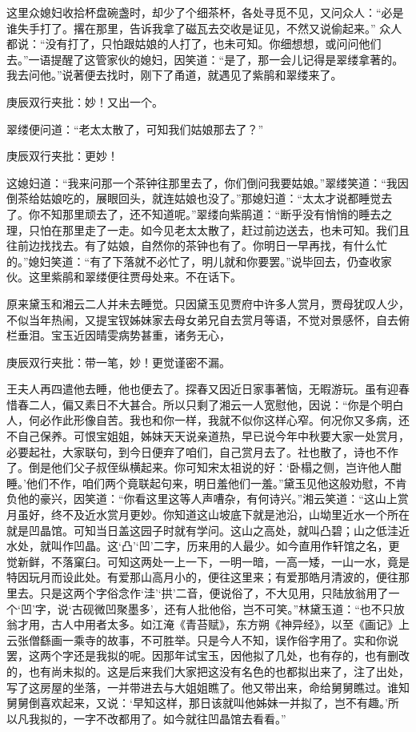 \begin{parag}
    这里众媳妇收拾杯盘碗盏时，却少了个细茶杯，各处寻觅不见，又问众人：“必是谁失手打了。撂在那里，告诉我拿了磁瓦去交收是证见，不然又说偷起来。” 众人都说：“没有打了，只怕跟姑娘的人打了，也未可知。你细想想，或问问他们去。”一语提醒了这管家伙的媳妇，因笑道：“是了，那一会儿记得是翠缕拿著的。我去问他。”说著便去找时，刚下了甬道，就遇见了紫鹃和翠缕来了。\begin{note}庚辰双行夹批：妙！又出一个。\end{note}翠缕便问道：“老太太散了，可知我们姑娘那去了？”\begin{note}庚辰双行夹批：更妙！\end{note}这媳妇道：“我来问那一个茶钟往那里去了，你们倒问我要姑娘。”翠缕笑道：“我因倒茶给姑娘吃的，展眼回头，就连姑娘也没了。”那媳妇道：“太太才说都睡觉去了。你不知那里顽去了，还不知道呢。”翠缕向紫鹃道：“断乎没有悄悄的睡去之理，只怕在那里走了一走。如今见老太太散了，赶过前边送去，也未可知。我们且往前边找找去。有了姑娘，自然你的茶钟也有了。你明日一早再找，有什么忙的。”媳妇笑道：“有了下落就不必忙了，明儿就和你要罢。”说毕回去，仍查收家伙。这里紫鹃和翠缕便往贾母处来。不在话下。
\end{parag}


\begin{parag}
    原来黛玉和湘云二人并未去睡觉。只因黛玉见贾府中许多人赏月，贾母犹叹人少，不似当年热闹，又提宝钗姊妹家去母女弟兄自去赏月等语，不觉对景感怀，自去俯栏垂泪。宝玉近因晴雯病势甚重，诸务无心，\begin{note}庚辰双行夹批：带一笔，妙！更觉谨密不漏。\end{note}王夫人再四遣他去睡，他也便去了。探春又因近日家事著恼，无暇游玩。虽有迎春惜春二人，偏又素日不大甚合。所以只剩了湘云一人宽慰他，因说：“你是个明白人，何必作此形像自苦。我也和你一样，我就不似你这样心窄。何况你又多病，还不自己保养。可恨宝姐姐，姊妹天天说亲道热，早已说今年中秋要大家一处赏月，必要起社，大家联句，到今日便弃了咱们，自己赏月去了。社也散了，诗也不作了。倒是他们父子叔侄纵横起来。你可知宋太祖说的好：‘卧榻之侧，岂许他人酣睡。’他们不作，咱们两个竟联起句来，明日羞他们一羞。”黛玉见他这般劝慰，不肯负他的豪兴，因笑道：“你看这里这等人声嘈杂，有何诗兴。”湘云笑道：“这山上赏月虽好，终不及近水赏月更妙。你知道这山坡底下就是池沿，山坳里近水一个所在就是凹晶馆。可知当日盖这园子时就有学问。这山之高处，就叫凸碧；山之低洼近水处，就叫作凹晶。这‘凸’‘凹’二字，历来用的人最少。如今直用作轩馆之名，更觉新鲜，不落窠臼。可知这两处一上一下，一明一暗，一高一矮，一山一水，竟是特因玩月而设此处。有爱那山高月小的，便往这里来；有爱那皓月清波的，便往那里去。只是这两个字俗念作‘洼’‘拱’二音，便说俗了，不大见用，只陆放翁用了一个‘凹’字，说‘古砚微凹聚墨多’，还有人批他俗，岂不可笑。”林黛玉道：“也不只放翁才用，古人中用者太多。如江淹《青苔赋》，东方朔《神异经》，以至《画记》上云张僧繇画一乘寺的故事，不可胜举。只是今人不知，误作俗字用了。实和你说罢，这两个字还是我拟的呢。因那年试宝玉，因他拟了几处，也有存的，也有删改的，也有尚未拟的。这是后来我们大家把这没有名色的也都拟出来了，注了出处，写了这房屋的坐落，一并带进去与大姐姐瞧了。他又带出来，命给舅舅瞧过。谁知舅舅倒喜欢起来，又说：‘早知这样，那日该就叫他姊妹一并拟了，岂不有趣。’所以凡我拟的，一字不改都用了。如今就往凹晶馆去看看。”
\end{parag}


